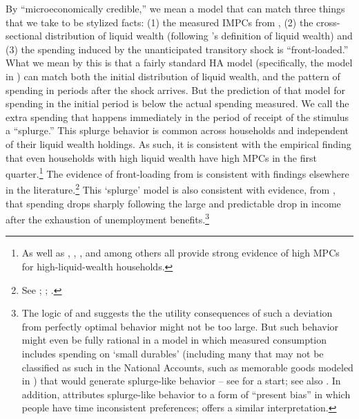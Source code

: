 \documentclass[\econtexRoot/HAFiscal]{subfiles}
\begin{document}
By ``microeconomically credible,'' we mean a model that can match three things that we take to be stylized facts: (1) the measured IMPCs from \cite{fagereng_mpc_2021}, (2) the cross-sectional distribution of liquid wealth (following \cite{kaplan2014model}'s definition of liquid wealth) and (3) the spending induced by the unanticipated transitory shock is ``front-loaded.''  What we mean by this is that a fairly standard HA model (specifically, the model in \cite{cstwMPC}) can match both the initial distribution of liquid wealth, and the pattern of spending in periods after the shock arrives.  But the prediction of that model for spending in the initial period is below the actual spending measured. We call the extra spending that happens immediately in the period of receipt of the stimulus a ``splurge.''  This splurge behavior is common across households and independent of their liquid wealth holdings. As such, it is consistent with the empirical finding that even households with high liquid wealth have high MPCs in the first quarter.\footnote{As well as \cite{fagereng_mpc_2021}, \cite{graham2024mental}, \cite{crawley2023MicroMacro}, and \cite{kueng2018excess} among others all provide strong evidence of high MPCs for high-liquid-wealth households.} The evidence of front-loading from \cite{fagereng_mpc_2021} is consistent with findings elsewhere in the literature.\footnote{See \cite{parker2013consumer}; \cite{olafsson2018liquid}; \cite{ganongConsumer2019}.} This `splurge' model is also consistent with evidence, from \cite{ganongConsumer2019}, that spending drops sharply following the large and predictable drop in income after the exhaustion of unemployment benefits.\footnote{The logic of \cite{akerlof1985near} and \cite{cochrane1989sensitivity} suggests the the utility consequences of such a deviation from perfectly optimal behavior might not be too large.  But such behavior might even be fully rational in a model in which measured consumption includes spending on `small durables' (including many that may not be classified as such in the National Accounts, such as memorable goods modeled in \cite{hkpMemorable}) that would generate splurge-like behavior -- see \cite{bcShocksStocks} for a start; see also \cite{laibson2022simple}. In addition, \citet{indarte2024explains} attributes splurge-like behavior to a form of ``present bias'' in which people have time inconsistent preferences; \cite{lmmPresentBias} offers a similar interpretation.}  
\end{document}
